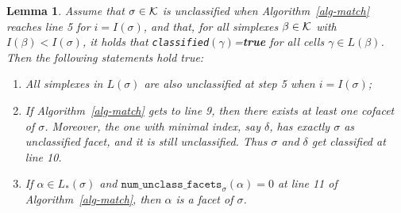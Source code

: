 \documentclass[12pt]{article}
\newtheorem{lem}[thm]{Lemma}
\newcommand{\cK}{{\cal K}}
\begin{document}
\begin{lem}\label{lem:line10}
  Assume that $\sigma\in \cK$ is unclassified when Algorithm~\ref{alg-match} reaches line 5 for $i=I(\sigma)$, and that, for all simplexes $\beta\in \cK$ with $I(\beta)<I(\sigma)$, it holds that \texttt{classified}$(\gamma)$={\bf true} for all cells $\gamma\in L(\beta)$. Then the following statements hold true:
\begin{enumerate}
\item[(i)] All simplexes in $L(\sigma)$ are  also unclassified at step 5 when $i=I(\sigma)$;
\item[(ii)] If Algorithm~\ref{alg-match} gets to line 9, then there exists at least one cofacet of $\sigma$. Moreover, the one with minimal index, say $\delta$, has exactly $\sigma$ as unclassified facet, and it is still unclassified. Thus $\sigma$ and $\delta$ get classified at line 10.
\item[(iii)] If $\alpha\in L_*(\sigma)$ and $\texttt{{num}\_{unclass}\_{facets}}_{\sigma} (\alpha)=0$ at line 11 of Algorithm~\ref{alg-match}, then $\alpha$ is a facet of $\sigma$.
\end{enumerate}
\end{lem}
\end{document}
